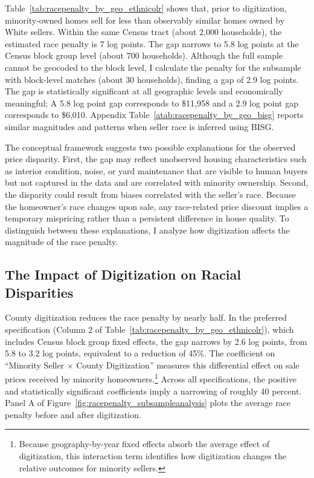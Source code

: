 \documentclass[11pt]{article}
\begin{document}
Table~\ref{tab:racepenalty_by_geo_ethnicolr} shows that, prior to digitization, minority-owned homes sell for less than observably similar homes owned by White sellers. Within the same Census tract (about 2,000 households), the estimated race penalty is 7 log points. The gap narrows to 5.8 log points at the Census block group level (about 700 households). Although the full sample cannot be geocoded to the block level, I calculate the penalty for the subsample with block-level matches (about 30 households), finding a gap of 2.9 log points. The gap is statistically significant at all geographic levels and economically meaningful; A 5.8 log point gap corresponds to \$11,958 and a 2.9 log point gap corresponds to \$6,010.  Appendix Table~\ref{atab:racepenalty_by_geo_bisg} reports similar magnitudes and patterns when seller race is inferred using BISG.

The conceptual framework suggests two possible explanations for the observed price disparity. First, the gap may reflect unobserved housing characteristics such as interior condition, noise, or yard maintenance that are visible to human buyers but not captured in the data and are correlated with minority ownership. Second, the disparity could result from biases correlated with the seller’s race. Because the homeowner’s race changes upon sale, any race-related price discount implies a temporary mispricing rather than a persistent difference in house quality. To distinguish between these explanations, I analyze how digitization affects the magnitude of the race penalty.

\subsection{The Impact of Digitization on Racial Disparities} \label{sec:digitonracepenalty}
County digitization reduces the race penalty by nearly half. In the preferred specification (Column 2 of Table~\ref{tab:racepenalty_by_geo_ethnicolr}), which includes Census block group fixed effects, the gap narrows by 2.6 log points, from 5.8 to 3.2 log points, equivalent to a reduction of 45\%. The coefficient on ``Minority Seller $\times$ County Digitization'' measures this differential effect on sale prices received by minority homeowners.\footnote{Because geography-by-year fixed effects absorb the average effect of digitization, this interaction term identifies how digitization changes the relative outcomes for minority sellers.} Across all specifications, the positive and statistically significant coefficients imply a narrowing of roughly 40 percent. Panel A of Figure~\ref{fig:racepenalty_subsampleanalysis} plots the average race penalty before and after digitization. 
\end{document}
